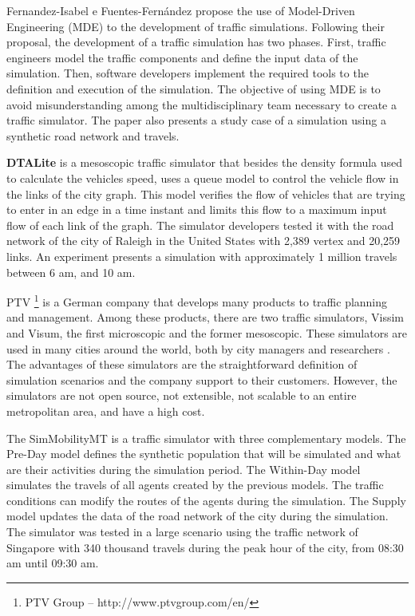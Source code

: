 Fernandez-Isabel e Fuentes-Fern\'andez \cite{fernandez2015model} propose the use of Model-Driven Engineering (MDE) to the development of traffic simulations. Following their proposal, the development of a traffic simulation has two phases. First, traffic engineers model the traffic components and define the input data of the simulation. Then, software developers implement the required tools to the definition and execution of the simulation. The objective of using MDE is to avoid misunderstanding among the multidisciplinary team necessary to create a traffic simulator. The paper also presents a study case of a simulation using a synthetic road network and travels. 

\textbf{DTALite} \cite{zhou2014dtalite} is a mesoscopic traffic simulator that besides the density formula used to calculate the vehicles speed, uses a queue model to control the vehicle flow in the links of the city graph. This model verifies the flow of vehicles that are trying to enter in an edge in a time instant and limits this flow to a maximum input flow of each link of the graph. The simulator developers tested it with the road network of the city of Raleigh in the United States with 2,389 vertex and 20,259 links. An experiment presents a simulation with approximately 1 million travels between 6 am, and 10 am.

PTV \footnote{PTV Group -- http://www.ptvgroup.com/en/} is a German company that develops many products to traffic planning and management. Among these products, there are two traffic simulators, Vissim and Visum, the first microscopic and the former mesoscopic. These simulators are used in many cities around the world, both by city managers and researchers \cite{buck2017calibrating,leyn2015calibrating}. The advantages of these simulators are the straightforward definition of simulation scenarios and the company support to their customers. However, the simulators are not open source, not extensible, not scalable to an entire metropolitan area, and have a high cost.

The SimMobilityMT is a traffic simulator with three complementary models. The Pre-Day model defines the synthetic population that will be simulated and what are their activities during the simulation period. The Within-Day model simulates the travels of all agents created by the previous models. The traffic conditions can modify the routes of the agents during the simulation. The Supply model updates the data of the road network of the city during the simulation. The simulator was tested in a large scenario using the traffic network of Singapore with 340 thousand travels during the peak hour of the city, from 08:30 am until 09:30 am.

